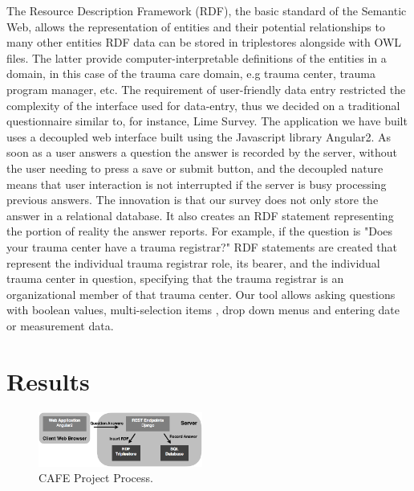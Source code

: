 \documentclass{amia}
\begin{document}
The Resource Description Framework (RDF), the basic standard of the Semantic Web, allows the representation of entities and their potential relationships to many other entities
RDF data can be stored in triplestores alongside with OWL files.
The latter provide computer-interpretable definitions of the entities in  a domain, in this case of the trauma care domain, e.g trauma center, trauma program manager, etc.
The requirement of user-friendly data entry restricted the complexity of the interface used for data-entry, thus we decided on a traditional questionnaire similar to, for instance, Lime Survey. 
The application we have built uses a decoupled web interface built using the Javascript library Angular2.
As soon as a user answers a question the answer is recorded by the server, without the user needing to press a save or submit button, and the decoupled nature means that user interaction is not interrupted if the server is busy processing previous answers.
The innovation is that our survey does not only store the answer in a relational database. 
It also creates an RDF statement representing the portion of reality the answer reports.
For example, if the question is "Does your trauma center have a trauma registrar?" RDF statements are created that represent the individual trauma registrar role, its bearer, and the individual trauma center in question, specifying that the trauma registrar is an organizational member of that trauma center.
Our tool allows asking questions with boolean values, multi-selection items , drop down menus and entering date or measurement data.

\section*{Results}

\begin{figure}
  \begin{center}
    \includegraphics[width=0.48\textwidth]{pics/cafe_process2.png}
  \end{center}
  \caption{CAFE Project Process.}
  \label{cafe_process}
\end{figure}
\end{document}
